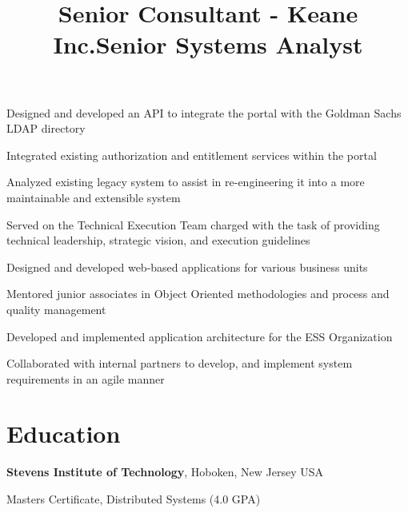 \documentclass[margin,line]{resume}
\newenvironment{bullet-list}{
  \begin{list}{$\bullet$}{%
      \setlength{\itemsep}{0in}
      \setlength{\parsep}{0in} \setlength{\parskip}{0in}
      \setlength{\topsep}{0in} \setlength{\partopsep}{0in}
      \setlength{\leftmargin}{0.2in}}}{\end{list}}
\begin{document}
\begin{resume}
\title{Senior Consultant - Keane Inc.}
\begin{position}
\vspace{-.3cm}
\begin{bullet-list}
\item Designed and developed an API to integrate the portal with the Goldman
Sachs LDAP directory
\item Integrated existing authorization and entitlement services within the portal
\item Analyzed existing legacy system to assist in re-engineering it into a
more maintainable and extensible system
\item Served on the Technical Execution Team charged with the task of providing
technical leadership, strategic vision, and execution guidelines
\end{bullet-list}
\end{position}

\title{Senior Systems Analyst}
\begin{position}
\vspace{-.3cm}
\begin{bullet-list}
\item Designed and developed web-based applications for various business units
\item Mentored junior associates in Object Oriented methodologies and process and
quality management
\item Developed and implemented application architecture for the ESS Organization
\item Collaborated with internal partners to develop, and implement system
requirements in an agile manner
\end{bullet-list}
\end{position}

\section{\sc Education}
{\bf Stevens Institute of Technology}, Hoboken, New Jersey USA\\
\vspace*{-.1in}
\begin{list1}
\item[] Masters Certificate, Distributed Systems  (4.0 GPA)
\end{list1}


\end{resume}
\end{document}
